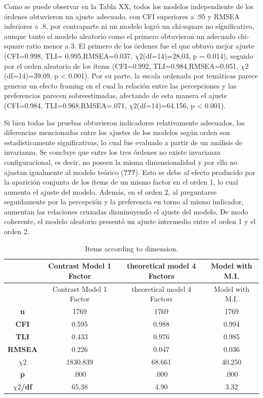 \documentclass[
]{article}
\begin{document}
Como se puede observar en la Tabla XX, todos los modelos independiente
de los órdenes obtuvieron un ajuste adecuado. con CFI superiores a .95 y
RMSEA inferiores a .8, por contraparte ni un modelo logró un chi-square
no significativo, aunque tanto el modelo aleatorio como el primero
obtuvieron un adecuado chi-square ratio menor a 3. El primero de los
órdenes fue el que obtuvo mejor ajuste (CFI=0.998, TLI=
0.995,RMSEA=0.037, \(\chi2\)(df=14)=28,03, p = 0.014), seguido por el
orden aleatorio de los ítems (CFI=0.992, TLI=0.984,RMSEA=0.051,
\(\chi2\)(df=14)=39.09, p \textless{} 0.001). Por su parte, la escala
ordenada por temáticas parece generar un efecto framing en el cual la
relación entre las percepciones y las preferencias parecen
sobreestimadas, afectando de esta manera el ajuste (CFI=0.984,
TLI=0.968,RMSEA=.071, \(\chi2\)(df=14)=64.156, p \textless{} 0.001).

Si bien todas las pruebas obtuvieron indicadores relativamente
adecuados, las diferencias mencionadas entre los ajustes de los modelos
según orden son estadísticamente significativas, lo cual fue evaluado a
partir de un análisis de invarianza. Se concluye que entre los tres
órdenes no existe invarianza configuracional, es decir, no poseen la
misma dimensionalidad y por ello no ajustan igualmente al modelo teórico
({\textbf{???}}). Esto se debe al efecto producido por la aparición
conjunta de los ítems de un mismo factor en el orden 1, lo cual aumenta
el ajuste del modelo. Además, en el orden 2, al preguntarse seguidamente
por la percepción y la preferencia en torno al mismo indicador, aumentan
las relaciones cruzadas disminuyendo el ajuste del modelo. De modo
coherente, el modelo aleatorio presentó un ajuste intermedio entre el
orden 1 y el orden 2.

\pagebreak

\begin{longtable}[]{@{}cccc@{}}
\caption{Items according to dimension.}\tabularnewline
\toprule
& Contrast Model 1 Factor & theoretical model 4 Factors & Model with
M.I.\tabularnewline
\midrule
\endfirsthead
\toprule
& Contrast Model 1 Factor & theoretical model 4 Factors & Model with
M.I.\tabularnewline
\midrule
\endhead
\textbf{n} & 1769 & 1769 & 1769\tabularnewline
\textbf{CFI} & 0.595 & 0.988 & 0.994\tabularnewline
\textbf{TLI} & 0.433 & 0.976 & 0.985\tabularnewline
\textbf{RMSEA} & 0.226 & 0.047 & 0.036\tabularnewline
\textbf{\(\chi2\)} & 1830.839 & 68.661 & 40.250\tabularnewline
\textbf{p} & .000 & .000 & .000\tabularnewline
\textbf{\(\chi2\)/df} & 65.38 & 4.90 & 3.32\tabularnewline
\bottomrule
\end{longtable}
\end{document}
